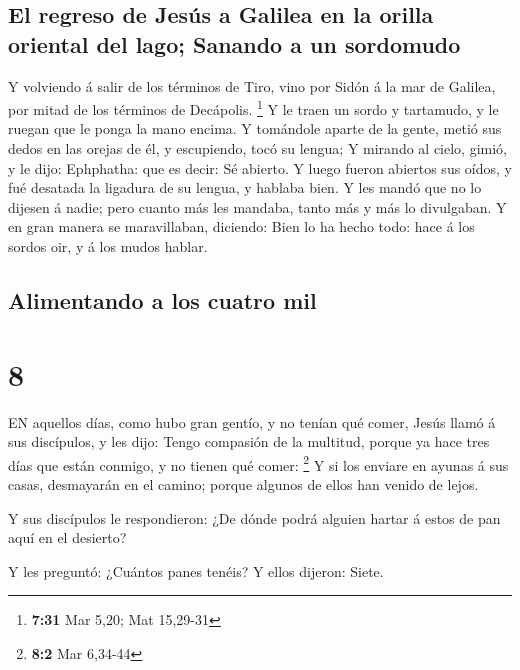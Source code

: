 \hypertarget{el-regreso-de-jesuxfas-a-galilea-en-la-orilla-oriental-del-lago-sanando-a-un-sordomudo}{%
\subsection{El regreso de Jesús a Galilea en la orilla oriental del
lago; Sanando a un
sordomudo}\label{el-regreso-de-jesuxfas-a-galilea-en-la-orilla-oriental-del-lago-sanando-a-un-sordomudo}}

 Y volviendo á salir de los términos de Tiro, vino por
Sidón á la mar de Galilea, por mitad de los términos de Decápolis.
\footnote{\textbf{7:31} Mar 5,20; Mat 15,29-31}  Y le traen
un sordo y tartamudo, y le ruegan que le ponga la mano encima.
 Y tomándole aparte de la gente, metió sus dedos en las
orejas de él, y escupiendo, tocó su lengua;  Y mirando al
cielo, gimió, y le dijo: Ephphatha: que es decir: Sé abierto.
 Y luego fueron abiertos sus oídos, y fué desatada la
ligadura de su lengua, y hablaba bien.  Y les mandó que no
lo dijesen á nadie; pero cuanto más les mandaba, tanto más y más lo
divulgaban.  Y en gran manera se maravillaban, diciendo:
Bien lo ha hecho todo: hace á los sordos oir, y á los mudos hablar.

\hypertarget{alimentando-a-los-cuatro-mil}{%
\subsection{Alimentando a los cuatro
mil}\label{alimentando-a-los-cuatro-mil}}

\hypertarget{section-7}{%
\section{8}\label{section-7}}

 EN aquellos días, como hubo gran gentío, y no tenían qué
comer, Jesús llamó á sus discípulos, y les dijo:  Tengo
compasión de la multitud, porque ya hace tres días que están conmigo, y
no tienen qué comer: \footnote{\textbf{8:2} Mar 6,34-44}  Y
si los enviare en ayunas á sus casas, desmayarán en el camino; porque
algunos de ellos han venido de lejos.

 Y sus discípulos le respondieron: ¿De dónde podrá alguien
hartar á estos de pan aquí en el desierto?

 Y les preguntó: ¿Cuántos panes tenéis? Y ellos dijeron:
Siete.

